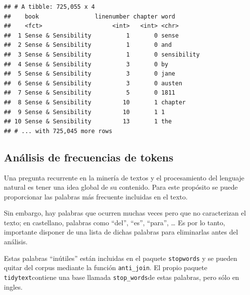 \documentclass[]{article}
\newenvironment{Shaded}{\begin{snugshade}}{\end{snugshade}}
\newcommand{\KeywordTok}[1]{\textcolor[rgb]{0.13,0.29,0.53}{\textbf{#1}}}
\newcommand{\StringTok}[1]{\textcolor[rgb]{0.31,0.60,0.02}{#1}}
\newcommand{\OperatorTok}[1]{\textcolor[rgb]{0.81,0.36,0.00}{\textbf{#1}}}
\newcommand{\NormalTok}[1]{#1}
\begin{document}
\begin{Shaded}
\end{Shaded}

\begin{verbatim}
## # A tibble: 725,055 x 4
##    book                linenumber chapter word       
##    <fct>                    <int>   <int> <chr>      
##  1 Sense & Sensibility          1       0 sense      
##  2 Sense & Sensibility          1       0 and        
##  3 Sense & Sensibility          1       0 sensibility
##  4 Sense & Sensibility          3       0 by         
##  5 Sense & Sensibility          3       0 jane       
##  6 Sense & Sensibility          3       0 austen     
##  7 Sense & Sensibility          5       0 1811       
##  8 Sense & Sensibility         10       1 chapter    
##  9 Sense & Sensibility         10       1 1          
## 10 Sense & Sensibility         13       1 the        
## # ... with 725,045 more rows
\end{verbatim}

\subsection{Análisis de frecuencias de
tokens}\label{analisis-de-frecuencias-de-tokens}

Una pregunta recurrente en la minería de textos y el procesamiento del
lenguaje natural es tener una idea global de su contenido. Para este
propósito se puede proporcionar las palabras más frecuente incluidas en
el texto.

Sin embargo, hay palabras que ocurren muchas veces pero que no
caracterizan el texto; en castellano, palabras como ``del'', ``es'',
``para'', \ldots{} Es por lo tanto, importante disponer de una lista de
dichas palabras para eliminarlas antes del análisis.

Estas palabras ``inútiles'' están incluidas en el paquete
\texttt{stopwords} y se pueden quitar del corpus mediante la función
\texttt{anti\_join}. El propio paquete \texttt{tidytext}contiene una
base llamada \texttt{stop\_words}de estas palabras, pero sólo en ingles.

\begin{Shaded}
\end{Shaded}
\end{document}
